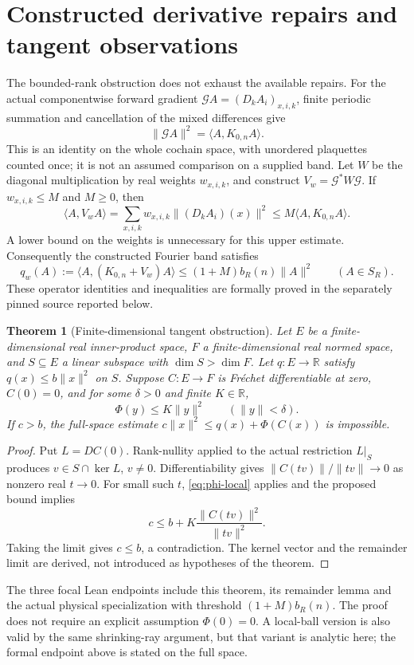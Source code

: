 \documentclass[11pt]{article}
\newtheorem{theorem}{Theorem}[section]
\newcommand{\R}{\mathbb R}
\newcommand{\ip}[2]{\langle #1,#2\rangle}
\begin{document}
\section{Constructed derivative repairs and tangent observations}\label{sec:tangent}
The bounded-rank obstruction does not exhaust the available repairs. For the
actual componentwise forward gradient $\mathcal G A=(D_k A_i)_{x,i,k}$, finite
periodic summation and cancellation of the mixed differences give
\[
 \|\mathcal G A\|^2=\ip{A}{K_{0,n}A}.
\]
This is an identity on the whole cochain space, with unordered plaquettes
counted once; it is not an assumed comparison on a supplied band. Let $W$ be
the diagonal multiplication by real weights $w_{x,i,k}$, and construct
$V_w=\mathcal G^*W\mathcal G$. If $w_{x,i,k}\le M$ and $M\ge0$, then
\begin{equation}\label{eq:weighted-actual}
 \ip{A}{V_w A}=\sum_{x,i,k}w_{x,i,k}\|(D_k A_i)(x)\|^2
 \le M\ip{A}{K_{0,n}A}.
\end{equation}
A lower bound on the weights is unnecessary for this upper estimate.
Consequently the constructed Fourier band satisfies
\[
 q_w(A):=\ip{A}{(K_{0,n}+V_w)A}
 \le (1+M)b_R(n)\|A\|^2 \qquad(A\in S_R).
\]
These operator identities and inequalities are formally proved in the
separately pinned source reported below.

\begin{theorem}[Finite-dimensional tangent obstruction]\label{thm:tangent}
Let $E$ be a finite-dimensional real inner-product space, $F$ a finite-dimensional
real normed space, and $S\subseteq E$ a linear subspace with $\dim S>\dim F$.
Let $q:E\to\R$ satisfy $q(x)\le b\|x\|^2$ on $S$. Suppose $C:E\to F$ is
Fr\'echet differentiable at zero, $C(0)=0$, and for some $\delta>0$ and finite
$K\in\R$,
\begin{equation}\label{eq:phi-local}
 \Phi(y)\le K\|y\|^2\qquad(\|y\|<\delta).
\end{equation}
If $c>b$, the full-space estimate
$c\|x\|^2\le q(x)+\Phi(C(x))$ is impossible.
\end{theorem}
\begin{proof}
Put $L=DC(0)$. Rank-nullity applied to the actual restriction $L|_S$ produces
$v\in S\cap\ker L$, $v\ne0$. Differentiability gives
$\|C(tv)\|/\|tv\|\to0$ as nonzero real $t\to0$. For small such $t$,
\eqref{eq:phi-local} applies and the proposed bound implies
\[
 c\le b+K\frac{\|C(tv)\|^2}{\|tv\|^2}.
\]
Taking the limit gives $c\le b$, a contradiction. The kernel vector and the
remainder limit are derived, not introduced as hypotheses of the theorem.
\end{proof}
The three focal Lean endpoints include this theorem, its remainder lemma and
the actual physical specialization with threshold $(1+M)b_R(n)$. The proof
does not require an explicit assumption $\Phi(0)=0$. A local-ball version is
also valid by the same shrinking-ray argument, but that variant is analytic
here; the formal endpoint above is stated on the full space.
\end{document}
